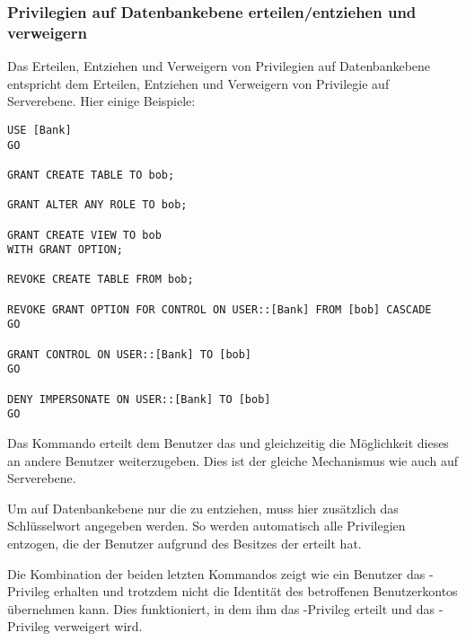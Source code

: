         \subsubsection{Privilegien auf Datenbankebene erteilen/entziehen
        und verweigern}
          Das Erteilen, Entziehen und Verweigern von Privilegien auf
          Datenbankebene entspricht dem Erteilen, Entziehen und Verweigern von
          Privilegie auf Serverebene. Hier einige Beispiele:
          \begin{lstlisting}[language=ms_sql, caption={Privilegien auf
          Datenbankebene erteilen, entziehen und verweigern},label=admin19_08g]
USE [Bank]
GO

GRANT CREATE TABLE TO bob;

GRANT ALTER ANY ROLE TO bob;

GRANT CREATE VIEW TO bob
WITH GRANT OPTION;

REVOKE CREATE TABLE FROM bob;

REVOKE GRANT OPTION FOR CONTROL ON USER::[Bank] FROM [bob] CASCADE
GO

GRANT CONTROL ON USER::[Bank] TO [bob]
GO

DENY IMPERSONATE ON USER::[Bank] TO [bob]
GO
          \end{lstlisting}
          Das Kommando  erteilt dem Benutzer  das  und gleichzeitig die Möglichkeit dieses an andere Benutzer
          weiterzugeben. Dies ist der gleiche Mechanismus wie auch auf
          Serverebene.
          
          Um auf Datenbankebene nur die  zu
          entziehen, muss hier zusätzlich das Schlüsselwort
           angegeben werden. So werden automatisch alle
          Privilegien entzogen, die der Benutzer aufgrund des Besitzes der
           erteilt hat.
          
          Die Kombination der beiden letzten Kommandos zeigt wie ein Benutzer
          das -Privileg erhalten und trotzdem nicht die
          Identität des betroffenen Benutzerkontos übernehmen kann. Dies
          funktioniert, in dem ihm das -Privileg erteilt und
          das -Privileg verweigert wird.
          \begin{literaturinternet}
            \item \cite{ms188396}
            \item \cite{ms187728}
          \end{literaturinternet}
